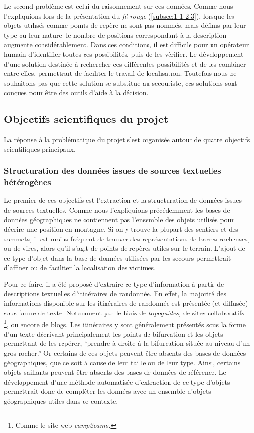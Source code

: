 Le second problème est celui du raisonnement sur ces données. Comme
nous l'expliquions lors de la présentation du \emph{fil rouge}
(\ref{subsec:1-1-2-3}), lorsque les objets utilisés comme points de
repère ne sont pas nommés, mais définis par leur type ou leur nature,
le nombre de positions correspondant à la description augmente
considérablement. Dans ces conditions, il est difficile pour un
opérateur humain d'identifier toutes ces possibilités, puis de les
vérifier. Le développement d'une solution destinée à rechercher ces
différentes possibilités et de les combiner entre elles, permettrait
de faciliter le travail de localisation. Toutefois nous ne souhaitons
pas que cette solution se substitue au secouriste, ces solutions sont
conçues pour être des outils d'aide à la décision.

\subsection{Objectifs scientifiques du projet}
\label{subsec:1-2-3}

La réponse à la problématique du projet s'est organisée autour de
quatre objectifs scientifiques principaux.

\subsubsection{Structuration des données issues de sources textuelles
  hétérogènes}
\label{subsec:1-2-3-1}

Le premier de ces objectifs est l'extraction et la structuration de
données issues de sources textuelles. Comme nous l’expliquions
précédemment les bases de données géographiques ne contiennent pas
l'ensemble des objets utilisés pour décrire une position en
montagne. Si on y trouve la plupart des sentiers et des sommets, il
est moins fréquent de trouver des représentations de barres rocheuses,
ou de vires, alors qu'il s'agit de points de repères utiles sur le
terrain. L'ajout de ce type d'objet dans la base de données utilisées
par les secours permettrait d’affiner ou de faciliter la localisation
des victimes.

Pour ce faire, il a été proposé d'extraire ce type d'information à
partir de descriptions textuelles d'itinéraires de randonnée. En
effet, la majorité des informations disponible sur les itinéraires de
randonnée est présentée (et diffusée) sous forme de texte. Notamment
par le biais de \emph{topoguides,} de sites collaboratifs
\footnote{Comme le site web \emph{camp2camp.}}, ou encore de
blogs. Les itinéraires y sont généralement présentés sous la forme
d'un texte décrivant principalement les points de bifurcation et les
objets permettant de les repérer, \eg \enquote{prendre à droite à la
  bifurcation située au niveau d'un gros rocher.} Or certains de ces
objets peuvent être absents des bases de données géographiques, que ce
soit à cause de leur taille ou de leur type. Ainsi, certains objets
saillants peuvent être absents des bases de données de référence. Le
développement d'une méthode automatisée d'extraction de ce type
d'objets permettrait donc de compléter les données avec un ensemble
d'objets géographiques utiles dans ce contexte.

